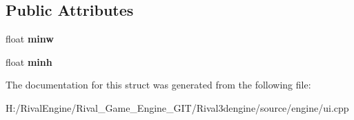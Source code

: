 \subsection*{Public Attributes}
\begin{DoxyCompactItemize}
\item 
\mbox{\label{struct_u_i_1_1_filler_a9957d8052c2ca6d47c26376952a69ffc}} 
float {\bfseries minw}
\item 
\mbox{\label{struct_u_i_1_1_filler_a5897a5bf89ce26db9d2c75688a34f1da}} 
float {\bfseries minh}
\end{DoxyCompactItemize}


The documentation for this struct was generated from the following file\+:\begin{DoxyCompactItemize}
\item 
H\+:/\+Rival\+Engine/\+Rival\+\_\+\+Game\+\_\+\+Engine\+\_\+\+G\+I\+T/\+Rival3dengine/source/engine/ui.\+cpp\end{DoxyCompactItemize}

